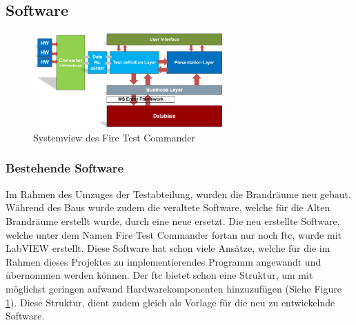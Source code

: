 \documentclass[10pt]{scrartcl}
\begin{document}
\subsection{Software}
\begin{figure}
	\begin{center}
		\includegraphics[width=0.65\textwidth]{SystemviewFTC}
		\caption{Systemview des Fire Test Commander}
		\label{fig:SystemViewFTC}
	\end{center}
\end{figure}
\subsubsection{Bestehende Software}
Im Rahmen des Umzuges der Testabteilung, wurden die Brandräume neu gebaut. Während des Baus wurde zudem die veraltete Software, welche für die Alten Brandräume erstellt wurde, durch eine neue ersetzt. Die neu erstellte Software, welche unter dem Namen Fire Test Commander fortan nur noch \acrshort{ftc}, wurde mit \gls{LabVIEW} erstellt. Diese Software hat schon viele Ansätze, welche für die im Rahmen dieses Projektes zu implementierendes Programm angewandt und übernommen werden können. Der \acrshort{ftc} bietet schon eine Struktur, um mit möglichst geringen aufwand Hardwarekomponenten hinzuzufügen (Siehe Figure \ref{fig:SystemViewFTC}). Diese Struktur, dient zudem gleich als Vorlage für die neu zu entwickelnde Software.
\newpage
\end{document}
